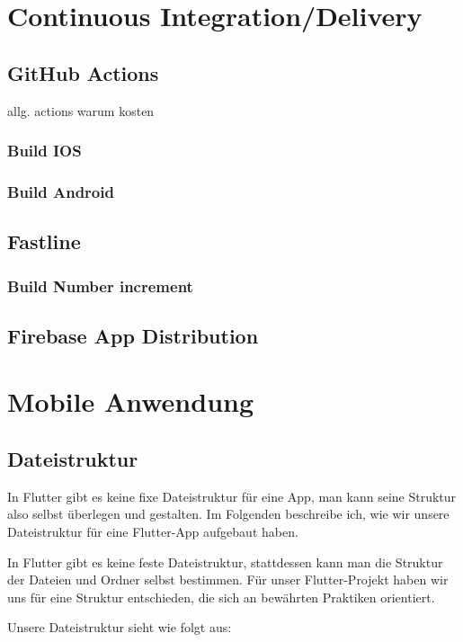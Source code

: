 \section{Continuous Integration/Delivery}
\subsection{GitHub Actions}

allg. actions warum kosten
\subsubsection{Build IOS}

\subsubsection{Build Android}

\subsection{Fastline}
\subsubsection{Build Number increment}
\subsection{Firebase App Distribution}

\section{Mobile Anwendung}
\subsection{Dateistruktur}
In Flutter gibt es keine fixe Dateistruktur für eine App,
man kann seine Struktur also selbst überlegen und gestalten.
Im Folgenden beschreibe ich, wie wir unsere Dateistruktur
für eine Flutter-App aufgebaut haben.

In Flutter gibt es keine feste Dateistruktur, stattdessen kann man die Struktur der Dateien und Ordner selbst bestimmen. Für unser Flutter-Projekt haben wir uns für eine Struktur entschieden, die sich an bewährten Praktiken orientiert.

Unsere Dateistruktur sieht wie folgt aus:

